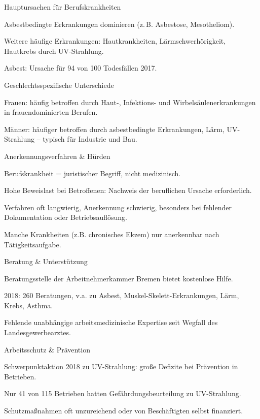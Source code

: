 Hauptursachen für Berufskrankheiten
\begin{myitemize}
\item Asbestbedingte Erkrankungen dominieren (z. B. Asbestose, Mesotheliom).
\item Weitere häufige Erkrankungen: Hautkrankheiten, Lärmschwerhörigkeit, Hautkrebs durch UV-Strahlung.
\item Asbest: Ursache für 94 von 100 Todesfällen 2017.
\end{myitemize}


Geschlechtsspezifische Unterschiede
\begin{myitemize}
\item Frauen: häufig betroffen durch Haut-, Infektions- und Wirbelsäulenerkrankungen in frauendominierten Berufen.
\item Männer: häufiger betroffen durch asbestbedingte Erkrankungen, Lärm, UV-Strahlung – typisch für Industrie und Bau.
\end{myitemize}


Anerkennungsverfahren & Hürden
\begin{myitemize}
\item Berufskrankheit = juristischer Begriff, nicht medizinisch.
\item Hohe Beweislast bei Betroffenen: Nachweis der beruflichen Ursache erforderlich.
\item Verfahren oft langwierig, Anerkennung schwierig, besonders bei fehlender Dokumentation oder Betriebsauflösung.
\item Manche Krankheiten (z.B. chronisches Ekzem) nur anerkennbar nach Tätigkeitsaufgabe.
\end{myitemize}


Beratung & Unterstützung
\begin{myitemize}
\item Beratungsstelle der Arbeitnehmerkammer Bremen bietet kostenlose Hilfe.
\item 2018: 260 Beratungen, v.a. zu Asbest, Muskel-Skelett-Erkrankungen, Lärm, Krebs, Asthma.
\item Fehlende unabhängige arbeitsmedizinische Expertise seit Wegfall des Landesgewerbearztes.
\end{myitemize}


Arbeitsschutz & Prävention
\begin{myitemize}
\item Schwerpunktaktion 2018 zu UV-Strahlung: große Defizite bei Prävention in Betrieben.
\item Nur 41 von 115 Betrieben hatten Gefährdungsbeurteilung zu UV-Strahlung.
\item Schutzmaßnahmen oft unzureichend oder von Beschäftigten selbst finanziert.
\end{myitemize}


